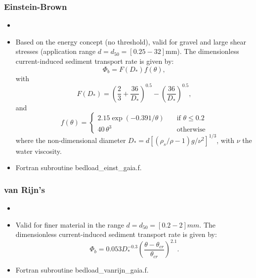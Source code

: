 \subsubsection{Einstein-Brown}
\begin{itemize}
\item {}
\item Based on the energy concept (no threshold), valid for gravel and large shear
stresses (application range $d=d_{50} = [0.25-32]$mm). The dimensionless current-induced sediment transport rate is given by:
\begin{equation*}
\Phi_b = F(D_*)f(\theta),
\end{equation*}
with
\begin{equation*}\label{eq:EinsteinFDs}
F(D_*) = \left(\frac{2}{3} +\frac{36}{D_*}\right)^{0.5} - \left( \frac{36}{D_*}\right)^{0.5},
\end{equation*}
and
\begin{equation*}
f(\theta)=\left\{\begin{array}{ll}
2.15\exp(-0.391/\theta) & \quad\text{if}\,\,\theta \leq 0.2 \\
40\,\theta^{3}          & \quad\text{otherwise}
\end{array}
\right.
\end{equation*}
where the non-dimensional diameter $D_*=d[(\rho_s/\rho-1)g/\nu^2]^{1/3}$, with $\nu$ the water viscosity.
\item Fortran subroutine {\ttfamily bedload\_einst\_gaia.f}.
\end{itemize}

\subsubsection{van Rijn's}
\begin{itemize}
\item {}
\item Valid for finer material in the range $d = d_{50} = [0.2-2]mm$. The dimensionless current-induced sediment transport rate is given by:
\begin{equation*}
\Phi_b = 0.053 D_*^{-0.3} \left( \frac{\theta-\theta_{cr}}{\theta_{cr}} \right)^{2.1}.
\end{equation*}

\item Fortran subroutine {\ttfamily bedload\_vanrijn\_gaia.f}.
\end{itemize}


